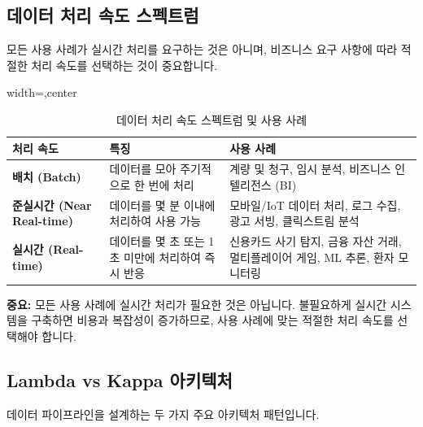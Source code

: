 \documentclass[11pt,a4paper]{article}
\begin{document}
\subsection{데이터 처리 속도 스펙트럼}

모든 사용 사례가 실시간 처리를 요구하는 것은 아니며, 비즈니스 요구 사항에 따라 적절한 처리 속도를 선택하는 것이 중요합니다.

\begin{table}[htbp]
\centering
\caption{데이터 처리 속도 스펙트럼 및 사용 사례}
\label{tab:data_processing_spectrum}
\begin{adjustbox}{width=\textwidth,center}
\begin{tabular}{lll}
\toprule
\textbf{처리 속도} & \textbf{특징} & \textbf{사용 사례} \\
\midrule
\textbf{배치 (Batch)} & 데이터를 모아 주기적으로 한 번에 처리 & 계량 및 청구, 임시 분석, 비즈니스 인텔리전스 (BI) \\
\textbf{준실시간 (Near Real-time)} & 데이터를 몇 분 이내에 처리하여 사용 가능 & 모바일/IoT 데이터 처리, 로그 수집, 광고 서빙, 클릭스트림 분석 \\
\textbf{실시간 (Real-time)} & 데이터를 몇 초 또는 1초 미만에 처리하여 즉시 반응 & 신용카드 사기 탐지, 금융 자산 거래, 멀티플레이어 게임, ML 추론, 환자 모니터링 \\
\bottomrule
\end{tabular}
\end{adjustbox}
\end{table}

\begin{warningbox}
\textbf{중요:} 모든 사용 사례에 실시간 처리가 필요한 것은 아닙니다. 불필요하게 실시간 시스템을 구축하면 비용과 복잡성이 증가하므로, 사용 사례에 맞는 적절한 처리 속도를 선택해야 합니다.
\end{warningbox}

\subsection{Lambda vs Kappa 아키텍처}

데이터 파이프라인을 설계하는 두 가지 주요 아키텍처 패턴입니다.
\end{document}
